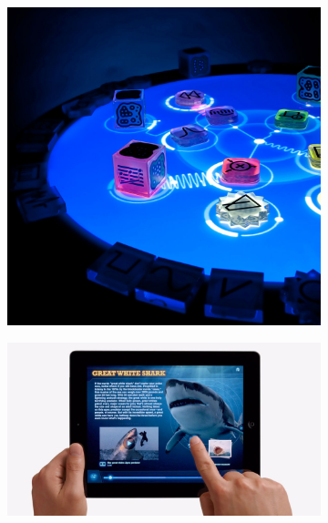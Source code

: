 \begin{figure}[h]
  \centering
  \begin{subfigure}[b]{.28\textwidth}
    \centering
    \includegraphics[width=\linewidth]{figures/touch/reactable}
    \label{sofa_interaction:reactable}
  \end{subfigure}%
  \hspace{0.03\textwidth}
  \begin{subfigure}[b]{.28\textwidth}
    \centering
    \includegraphics[width=\linewidth]{figures/touch/ipad}

\end{subfigure}
\end{figure}
